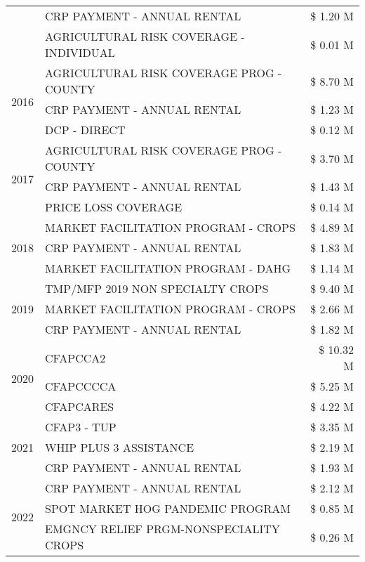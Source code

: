 \begin{tabular}{llr}
 & CRP PAYMENT - ANNUAL RENTAL & \$ 1.20 M \\
 & AGRICULTURAL RISK COVERAGE - INDIVIDUAL & \$ 0.01 M \\
\cline{1-3}
\multirow[t]{3}{*}{2016} & AGRICULTURAL RISK COVERAGE PROG - COUNTY & \$ 8.70 M \\
 & CRP PAYMENT - ANNUAL RENTAL & \$ 1.23 M \\
 & DCP - DIRECT & \$ 0.12 M \\
\cline{1-3}
\multirow[t]{3}{*}{2017} & AGRICULTURAL RISK COVERAGE PROG - COUNTY & \$ 3.70 M \\
 & CRP PAYMENT - ANNUAL RENTAL & \$ 1.43 M \\
 & PRICE LOSS COVERAGE & \$ 0.14 M \\
\cline{1-3}
\multirow[t]{3}{*}{2018} & MARKET FACILITATION PROGRAM - CROPS & \$ 4.89 M \\
 & CRP PAYMENT - ANNUAL RENTAL & \$ 1.83 M \\
 & MARKET FACILITATION PROGRAM - DAHG & \$ 1.14 M \\
\cline{1-3}
\multirow[t]{3}{*}{2019} & TMP/MFP 2019 NON SPECIALTY CROPS & \$ 9.40 M \\
 & MARKET FACILITATION PROGRAM - CROPS & \$ 2.66 M \\
 & CRP PAYMENT - ANNUAL RENTAL & \$ 1.82 M \\
\cline{1-3}
\multirow[t]{3}{*}{2020} & CFAPCCA2 & \$ 10.32 M \\
 & CFAPCCCCA & \$ 5.25 M \\
 & CFAPCARES & \$ 4.22 M \\
\cline{1-3}
\multirow[t]{3}{*}{2021} & CFAP3 - TUP & \$ 3.35 M \\
 & WHIP PLUS 3 ASSISTANCE & \$ 2.19 M \\
 & CRP PAYMENT - ANNUAL RENTAL & \$ 1.93 M \\
\cline{1-3}
\multirow[t]{3}{*}{2022} & CRP PAYMENT - ANNUAL RENTAL & \$ 2.12 M \\
 & SPOT MARKET HOG PANDEMIC PROGRAM & \$ 0.85 M \\
 & EMGNCY RELIEF PRGM-NONSPECIALITY CROPS & \$ 0.26 M \\
\cline{1-3}
\bottomrule
\end{tabular}
